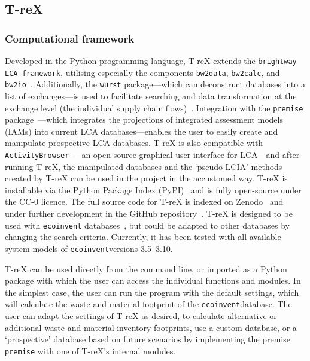 \documentclass[a4paper,fleqn,longmktitle]{cas-dc}
\begin{document}
\subsection{T-reX}\label{sec:method-TreX}

\subsubsection{Computational framework}

Developed in the Python programming language, T-reX extends the \texttt{brightway LCA framework}, utilising especially  the components \texttt{bw2data}, \texttt{bw2calc}, and \texttt{bw2io}~\citep{mutel2017brightway}. Additionally, the \texttt{wurst} package---which can deconstruct databases into a list of exchanges---is used to facilitate searching and data transformation at the exchange level (the individual supply chain flows)~\citep{mutel2017wurst}. Integration with the \texttt{premise} package~\citep{sacchi2022premise}---which integrates the projections of integrated assessment models (IAMs) into current LCA databases---enables the user to easily create and manipulate prospective LCA databases. T-reX is also compatible with \texttt{ActivityBrowser}~\citep{steubing2020activitybrowser}---an open-source graphical user interface for LCA---and after running T-reX, the manipulated databases and the `pseudo-LCIA' methods created by T-reX can be used in the project in the accustomed way. T-reX is installable via the Python Package Index (PyPI)~\citep{mcdowall2023T-reXpipy} and is fully open-source under the CC-0 licence. The full source code for T-reX is indexed on Zenodo~\citep{mcdowall2023T-reXzenodo} and under further development in the GitHub repository~\citep{mcdowall2024T-reXgithub}. T-reX is designed to be used with \texttt{ecoinvent} databases~\citep{ecoinvent2016version3}, but could be adapted to other databases by changing the search criteria. Currently, it has been tested with all available system models of \texttt{ecoinvent}versions 3.5--3.10.

T-reX can be used directly from the command line, or imported as a Python package with which the user can access the individual functions and modules. In the simplest case, the user can run the program with the default settings, which will calculate the waste and material footprint of the \texttt{ecoinvent}database. The user can adapt the settings of T-reX as desired, to calculate alternative or additional waste and material inventory footprints, use a custom database, or a `prospective' database based on future scenarios by implementing the premise \texttt{premise} with one of T-reX's internal modules.
\end{document}
